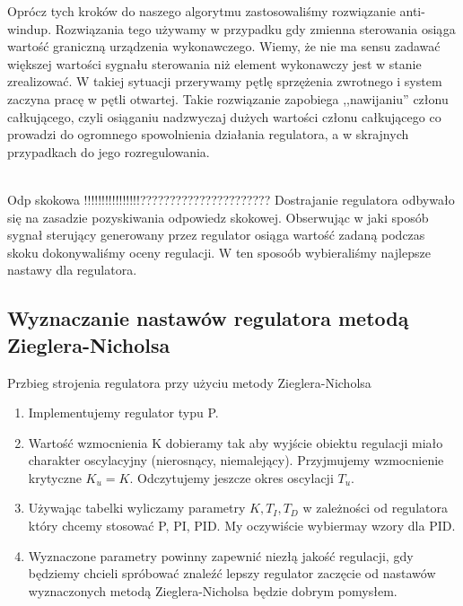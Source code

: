 \documentclass[12pt, a4paper]{article}
\begin{document}
Oprócz tych kroków do naszego algorytmu zastosowaliśmy rozwiązanie anti-windup. Rozwiązania tego używamy w przypadku gdy zmienna sterowania osiąga wartość graniczną urządzenia wykonawczego. Wiemy, że nie ma sensu zadawać większej wartości sygnału sterowania niż element wykonawczy jest w stanie zrealizować. W takiej sytuacji przerywamy pętlę sprzężenia zwrotnego i system zaczyna pracę w pętli otwartej. Takie rozwiązanie zapobiega ,,nawijaniu'' członu całkującego, czyli osiąganiu nadzwyczaj dużych wartości członu całkującego co prowadzi do ogromnego spowolnienia działania regulatora, a w skrajnych przypadkach do jego rozregulowania. 

~\\

Odp skokowa !!!!!!!!!!!!!!!!??????????????????????
Dostrajanie regulatora odbywało się na zasadzie pozyskiwania odpowiedz skokowej. Obserwując w jaki sposób sygnał sterujący generowany przez regulator osiąga wartość zadaną podczas skoku dokonywaliśmy oceny regulacji. W ten sposoób wybieraliśmy najlepsze nastawy dla regulatora. 

\subsection{Wyznaczanie nastawów regulatora metodą Zieglera-Nicholsa}

Przbieg strojenia regulatora przy użyciu metody Zieglera-Nicholsa
\begin{enumerate}
\item Implementujemy regulator typu P.
\item Wartość wzmocnienia K dobieramy tak aby wyjście obiektu regulacji miało charakter oscylacyjny (nierosnący, niemalejący). Przyjmujemy wzmocnienie krytyczne $K_{u} = K$. Odczytujemy jeszcze okres oscylacji $T_{u}$.

\item Używając tabelki wyliczamy parametry $K, T_{I}, T_{D}$ w zależności od regulatora który chcemy stosować P, PI, PID. My oczywiście wybiermay wzory dla PID. 
\item Wyznaczone parametry powinny zapewnić niezłą jakość regulacji, gdy będziemy chcieli spróbować znaleźć lepszy regulator zaczęcie od nastawów wyznaczonych metodą Zieglera-Nicholsa będzie dobrym pomysłem.
\end{enumerate}

\begin{figure}[h!]

\end{figure}
\end{document}
